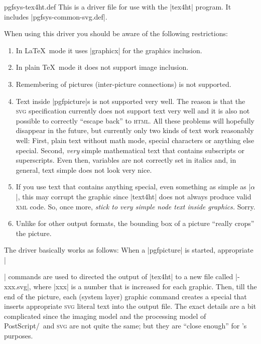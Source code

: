 \begin{filedescription}{pgfsys-tex4ht.def}
  This is a driver file for use with the |tex4ht| program. It includes
  |pgfsys-common-svg.def|.

  When using this driver you should be aware of the following
  restrictions: 
  \begin{enumerate}
  \item
    In \LaTeX\ mode it uses |graphicx| for the graphics
    inclusion.    
  \item
    In plain \TeX\ mode it does not support image inclusion.
  \item
    Remembering of pictures (inter-picture connections) is not
    supported. 
  \item
    Text inside |pgfpicture|s is not supported very well. The reason
    is that the \textsc{svg} specification currently does not support
    text very well and it is also not possible to correctly ``escape
    back'' to \textsc{html}. All these problems will hopefully
    disappear in the future, but currently only two kinds of text work
    reasonably well: First, plain text without math mode, special
    characters or anything else special. Second, \emph{very} simple
    mathematical text that contains subscripts or superscripts. Even
    then, variables are not correctly set in italics and, in general,
    text simple does not look very nice.
  \item
    If you use text that contains anything special, even something as
    simple as |$\alpha$|, this may corrupt the graphic since |text4ht|
    does not always produce valid \textsc{xml} code. So, once more,
    \emph{stick to very simple node text inside graphics.} Sorry.
  \item
    Unlike for other output formats, the bounding box of a picture
    ``really crops'' the picture.
  \end{enumerate}

  The driver basically works as follows: When a |{pgfpicture}| is
  started, appropriate |\special| commands are used to directed the
  output of |tex4ht| to a new file called |\jobname-xxx.svg|, where
  |xxx| is a number that is increased for each graphic. Then, till the
  end of the picture, each (system layer) graphic command creates a
  special that inserts appropriate \textsc{svg} literal text into the
  output file. The exact details are a bit complicated since the
  imaging model and the processing model of PostScript/\pdf\ and
  \textsc{svg} are not quite the same; but they are ``close enough''
  for \pgfname's purposes.
\end{filedescription}


